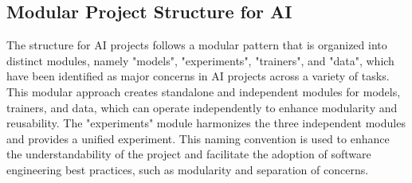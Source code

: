 \subsection{Modular Project Structure for AI}

The structure for AI projects follows a modular pattern that is organized into distinct modules, namely "models", "experiments", "trainers", and "data", which have been identified as major concerns in AI projects across a variety of tasks. This modular approach creates standalone and independent modules for models, trainers, and data, which can operate independently to enhance modularity and reusability. The "experiments" module harmonizes the three independent modules and provides a unified experiment. This naming convention is used to enhance the understandability of the project and facilitate the adoption of software engineering best practices, such as modularity and separation of concerns.









